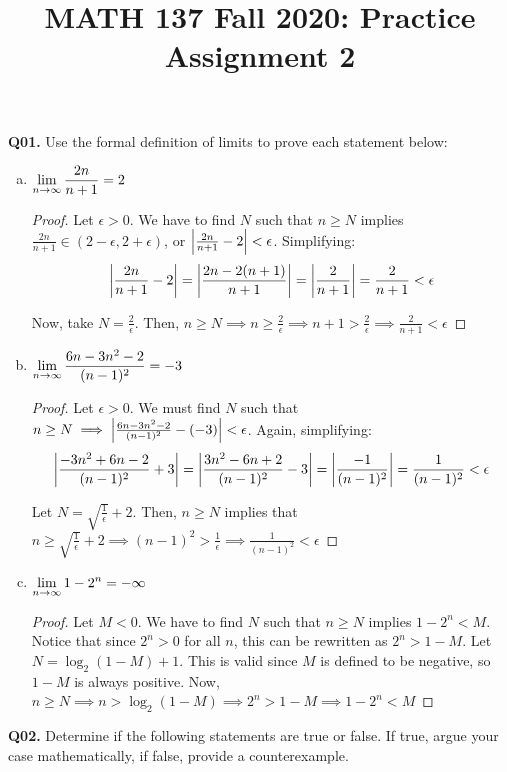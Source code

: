 \documentclass[11pt]{article}
\title{MATH 137 Fall 2020: Practice Assignment 2}
\begin{document}
\parindent=0pt
\thispagestyle{firstpage}

\textbf{\@title}

\textbf{Q01.}
Use the formal definition of limits to prove each statement below:

\begin{enumerate}[(a)]

  \item $\displaystyle\lim_{n\to\infty}\frac{2n}{n+1}=2$
        \begin{proof}
          Let $\epsilon>0$.
          We have to find $N$ such that $n\geq N$ implies $\frac{2n}{n+1}\in(2-\epsilon,2+\epsilon)$, or $\abs{\frac{2n}{n+1}-2}<\epsilon$.
          Simplifying:
          \[ \abs{\frac{2n}{n+1}-2} = \abs{\frac{2n-2(n+1)}{n+1}} = \abs{\frac{2}{n+1}} = \frac{2}{n+1} < \epsilon \]

          Now, take $N=\frac2\epsilon$.
          Then, $n\geq N\implies n\geq\frac2\epsilon\implies n+1>\frac2\epsilon\implies\frac2{n+1}<\epsilon$
        \end{proof}

  \item $\displaystyle\lim_{n\to\infty}\frac{6n-3n^2-2}{(n-1)^2}=-3$
        \begin{proof}
          Let $\epsilon>0$. We must find $N$ such that $n\geq N\implies \abs{\frac{6n-3n^2-2}{(n-1)^2}-(-3)}<\epsilon$. Again, simplifying:
          \[ \abs{\frac{-3n^2+6n-2}{(n-1)^2}+3} = \abs{\frac{3n^2-6n+2}{(n-1)^2}-3} = \abs{\frac{-1}{(n-1)^2}}= \frac{1}{(n-1)^2} < \epsilon \]

          Let $N=\sqrt{\frac1\epsilon}+2$. Then, $n\geq N$ implies that $n\geq\sqrt{\frac1\epsilon}+2 \implies (n-1)^2>\frac1\epsilon\implies\frac{1}{(n-1)^2}<\epsilon$
        \end{proof}

  \item $\displaystyle\lim_{n\to\infty}1-2^n=-\infty$
        \begin{proof}
          Let $M<0$. We have to find $N$ such that $n\geq N$ implies $1-2^n<M$. Notice that since $2^n>0$ for all $n$, this can be rewritten as $2^n>1-M$. Let $N=\log_2(1-M)+1$. This is valid since $M$ is defined to be negative, so $1-M$ is always positive. Now, $n\geq N\implies n>\log_2(1-M)\implies 2^n>1-M\implies1-2^n<M$
        \end{proof}

\end{enumerate}



\textbf{Q02.}
Determine if the following statements are true or false. If true, argue your case mathematically, if false, provide a counterexample.
\end{document}
